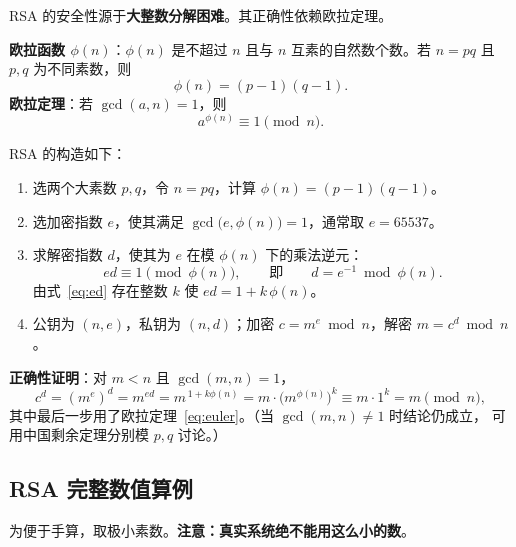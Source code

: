 RSA 的安全性源于\textbf{大整数分解困难}。其正确性依赖欧拉定理。

\textbf{欧拉函数 $\phi(n)$}：$\phi(n)$ 是不超过 $n$ 且与 $n$ 互素的自然数个数。若
$n=pq$ 且 $p,q$ 为不同素数，则
\begin{equation}
    \phi(n) = (p-1)(q-1).
    \label{eq:phi}
\end{equation}
\textbf{欧拉定理}：若 $\gcd(a,n)=1$，则
\begin{equation}
    a^{\phi(n)} \equiv 1 \pmod{n}.
    \label{eq:euler}
\end{equation}

RSA 的构造如下：
\begin{enumerate}
    \item 选两个大素数 $p,q$，令 $n=pq$，计算 $\phi(n)=(p-1)(q-1)$。
    \item 选加密指数 $e$，使其满足 $\gcd\bigl(e,\phi(n)\bigr)=1$，通常取 $e=65537$。
    \item 求解密指数 $d$，使其为 $e$ 在模 $\phi(n)$ 下的乘法逆元：
    \begin{equation}
        ed \equiv 1 \pmod{\phi(n)}, \qquad\text{即}\qquad
        d = e^{-1} \bmod \phi(n).
        \label{eq:ed}
    \end{equation}
    由式~\eqref{eq:ed} 存在整数 $k$ 使 $ed = 1 + k\,\phi(n)$。
    \item 公钥为 $(n,e)$，私钥为 $(n,d)$；加密 $c=m^e \bmod n$，解密 $m=c^d \bmod n$。
\end{enumerate}

\textbf{正确性证明}：对 $m<n$ 且 $\gcd(m,n)=1$，
\begin{equation}
    c^{d} = (m^{e})^{d} = m^{ed} = m^{\,1+k\phi(n)}
          = m \cdot \bigl(m^{\phi(n)}\bigr)^{k} \equiv m \cdot 1^{k} = m \pmod{n},
\end{equation}
其中最后一步用了欧拉定理~\eqref{eq:euler}。（当 $\gcd(m,n)\neq1$ 时结论仍成立，
可用中国剩余定理分别模 $p,q$ 讨论。）

\subsection{RSA 完整数值算例}

为便于手算，取极小素数。\textbf{注意：真实系统绝不能用这么小的数}。

